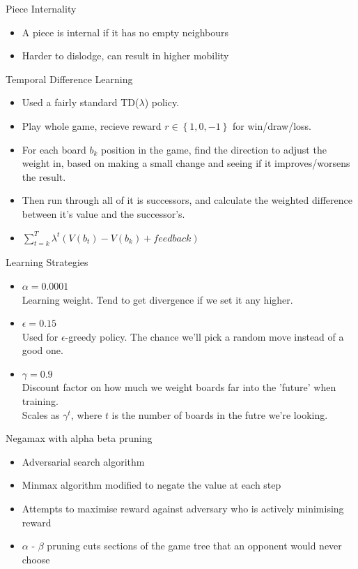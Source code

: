 \documentclass{beamer}
\begin{document}
\begin{frame}{Piece Internality}
    \begin{itemize}
  \item
  A piece is internal if it has no empty neighbours
  \item
   Harder to dislodge, can result in higher mobility
  \end{itemize}
\end{frame}

\begin{frame}{Temporal Difference Learning}
   \begin{itemize}
  \item
  	Used a fairly standard TD($\lambda$) policy.
  \item
	Play whole game, recieve reward $r\in \left\{1,0,-1 \right\}$ for win/draw/loss.
  \item
	For each board $b_k$ position in the game, find the direction to adjust the weight in, based on making a small change and seeing if it improves/worsens the result.
 \item
	Then run through all of it is successors, and calculate the weighted difference between it's value and the successor's.
  \item
	$\sum_{t=k}^T \lambda^t \left ( V(b_t) - V(b_k) + feedback \right)$
  \end{itemize}
\end{frame}

\begin{frame}{Learning Strategies}
\begin{itemize}
	\item $\alpha = 0.0001$
		\\ Learning weight. Tend to get divergence if we set it any higher.
	
	\item $\epsilon = 0.15$
		\\ Used for $\epsilon$-greedy policy. The chance we'll pick a random move instead of a good one.
	\item $\gamma = 0.9$
		\\ Discount factor on how much we weight boards far into the 'future' when training.
		\\ Scales as $\gamma^t$, where $t$ is the number of boards in the futre we're looking.
	\end{itemize}
\end{frame}

\begin{frame}{Negamax with alpha beta pruning}
    \begin{itemize}
  \item
    Adversarial search algorithm
  \item
    Minmax algorithm modified to negate the value at each step
  \item
    Attempts to maximise reward against adversary who is actively minimising reward
  \item
   $\alpha$ - $\beta$ pruning cuts sections of the game tree that an opponent would never choose
  \end{itemize}
\end{frame}
\end{document}
